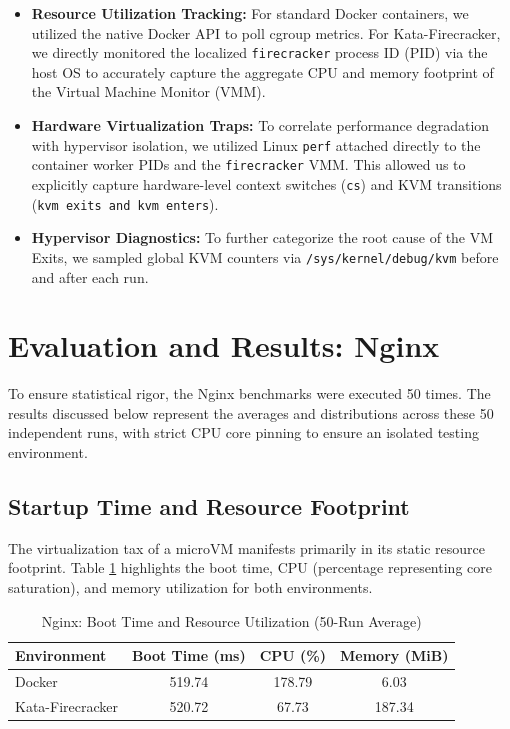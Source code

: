 \documentclass[conference]{IEEEtran}
\begin{document}
\begin{itemize}
    \item \textbf{Resource Utilization Tracking:} For standard Docker containers, we utilized the native Docker API to poll cgroup metrics. For Kata-Firecracker, we directly monitored the localized \texttt{firecracker} process ID (PID) via the host OS to accurately capture the aggregate CPU and memory footprint of the Virtual Machine Monitor (VMM).
    
    \item \textbf{Hardware Virtualization Traps:} To correlate performance degradation with hypervisor isolation, we utilized Linux \texttt{perf} attached directly to the container worker PIDs and the \texttt{firecracker} VMM. This allowed us to explicitly capture hardware-level context switches (\texttt{cs}) and KVM transitions (\texttt{kvm exits and kvm enters}).

    \item \textbf{Hypervisor Diagnostics:} To further categorize the root cause of the VM Exits, we sampled global KVM counters via \texttt{/sys/kernel/debug/kvm} before and after each run.
    
\end{itemize}

\section{Evaluation and Results: Nginx}

To ensure statistical rigor, the Nginx benchmarks were executed 50 times. The results discussed below represent the averages and distributions across these 50 independent runs, with strict CPU core pinning to ensure an isolated testing environment.

\subsection{Startup Time and Resource Footprint}
The virtualization tax of a microVM manifests primarily in its static resource footprint. Table \ref{tab:nginx_resources} highlights the boot time, CPU (percentage representing core saturation), and memory utilization for both environments. 

\begin{table}[htbp]
\caption{Nginx: Boot Time and Resource Utilization (50-Run Average)}
\begin{center}
\begin{tabular}{lccc}
\toprule
\textbf{Environment} & \textbf{Boot Time (ms)} & \textbf{CPU (\%)} & \textbf{Memory (MiB)} \\
\midrule
Docker & 519.74 & 178.79 & 6.03 \\
Kata-Firecracker & 520.72 & 67.73 & 187.34 \\
\bottomrule
\end{tabular}
\label{tab:nginx_resources}
\end{center}
\end{table}
\end{document}
